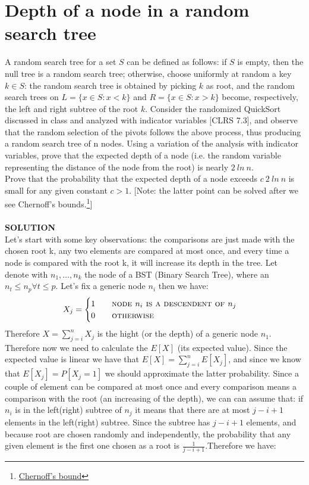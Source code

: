\documentclass[a4paper]{article}
\begin{document}
\section*{Depth of a node in a random search tree}
A random search tree for a set $S$ can be defined as follows: if $S$ is empty, then the null tree is a random search tree; otherwise, choose uniformly at random a key $k \in S$: the random search tree is obtained by picking $k$ as root, and the random search trees on $L = \{x \in S : x < k\}$ and $R = \{x \in S :x > k\}$ become, respectively, the left and right subtree of the root $k$. Consider the randomized QuickSort discussed in class and analyzed with indicator variables [CLRS 7.3], and observe that the random selection of the pivots follows the above process, thus producing a random search tree of n nodes. Using a variation of the analysis with indicator variables, prove that the expected depth of a node (i.e. the random variable representing the distance of the node from the root) is nearly $2\ ln \ n$. \\ Prove that the probability that the expected depth of a node exceeds $c \ 2 \ ln\ n$ is small for any given constant $c > 1$. [Note: the latter point can be solved after we see Chernoff’s bounds.\footnote{\href{http://math.mit.edu/~goemans/18310S15/chernoff-notes.pdf}{Chernoff's bound}}]\\
\\
\textbf{SOLUTION}
\\
Let's start with some key observations: the comparisons are just made with the chosen root k, any two elements are compared at most once, and every time a node is compared with the root k, it will increase its depth in the tree. Let denote with $n_1,\dots,n_k$ the node of a BST (Binary Search Tree), where an $n_t \leq n_p \forall t\leq p$. Let's fix a generic node $n_i$ then we have:
\begin{equation}
X_{j} =  
\begin{cases} 
1 \qquad \textsc{node } n_i \textsc{ is a descendent of } n_j\\
0 \qquad \textsc{otherwise}
\end{cases}
\nonumber
\end{equation}
Therefore $X=\sum_{j=i}^n X_{j}$ is the hight (or the depth) of a generic node $n_1$. Therefore now we need to calculate the $E[ X ]$ (its expected value). Since the expected value is linear we have that $E[X]= \sum_{j=i}^n E[X_{j}]$, and since we know that $E[X_j]=P[X_j=1]$ we should approximate the latter probability. Since a couple of element can be compared at most once and every comparison means a comparison with the root (an increasing of the depth), we can can assume that: if $n_i$ is in the left(right) subtree of $n_j$ it means that there are at most $j-i+1$ elements in the left(right) subtree. Since the subtree has $j-i+1$ elements, and because root are chosen randomly and independently, the probability that any given element is the first one chosen as a root is $\frac{1}{j-i+1}$.Therefore we have:
\end{document}

